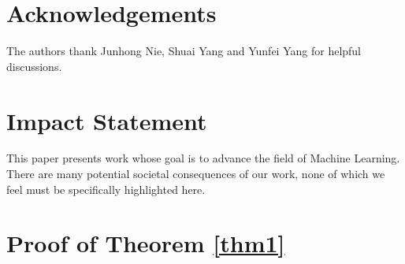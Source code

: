 \documentclass{article}
\theoremstyle{plain}
\theoremstyle{definition}
\theoremstyle{remark}
\begin{document}
\section*{Acknowledgements}
The authors thank Junhong Nie, Shuai Yang and Yunfei Yang for helpful discussions. 

\section*{Impact Statement}
This paper presents work whose goal is to advance the field of Machine Learning. There are many potential societal consequences of our work, none of which we feel must be specifically highlighted here.







\newpage
\appendix
\onecolumn
\section{Proof of Theorem \ref{thm1}}\label{apd1}
\end{document}
